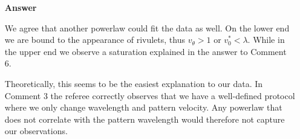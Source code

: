 \documentclass[12pt,english]{article}
\begin{document}
\begin{itemize}
\item[ \textbf{{Answer}}]
{ 
We agree that another powerlaw could fit the data as well.
On the lower end we are bound to the appearance of rivulets, thus $v_{\theta} > 1$ or $v_0^{\ast} < \lambda$.
While in the upper end we observe a saturation explained in the answer to Comment 6.

Theoretically, this seems to be the easiest explanation to our data.
In Comment 3 the referee correctly observes that we have a well-defined protocol where we only change wavelength and pattern velocity.
Any powerlaw that does not correlate with the pattern wavelength would therefore not capture our observations.
}


\end{itemize}



\end{document}
